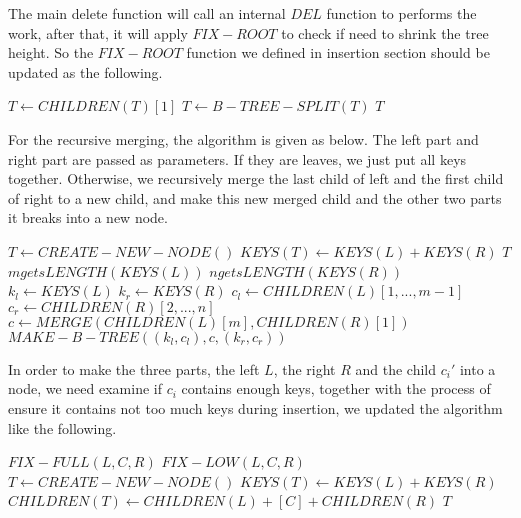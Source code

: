 \documentclass{article}
\begin{document}
The main delete function will call an internal $DEL$ function to
performs the work, after that, it will apply $FIX-ROOT$ to check
if need to shrink the tree height. So the $FIX-ROOT$ function we
defined in insertion section should be updated as the following.

\begin{algorithmic}[1]
   
    \State $T \gets CHILDREN(T)[1]$
    \State $T \gets B-TREE-SPLIT(T)$
  \EndIf
  \State \Return $T$
\EndFunction
\end{algorithmic}

For the recursive merging, the algorithm is given as below.
The left part and right part are passed as parameters. If
they are leaves, we just put all keys together. Otherwise,
we recursively merge the last child of left and the first child
of right to a new child, and make this new merged child and
the other two parts it breaks into a new node.

\begin{algorithmic}[1]
    \State $T \gets CREATE-NEW-NODE()$
    \State $KEYS(T) \gets KEYS(L)+KEYS(R)$
    \State \Return $T$
  \Else
    \State $m gets LENGTH(KEYS(L))$
    \State $n gets LENGTH(KEYS(R))$
    \State $k_l \gets KEYS(L)$
    \State $k_r \gets KEYS(R)$
    \State $c_l \gets CHILDREN(L)[1, ..., m-1]$
    \State $c_r \gets CHILDREN(R)[2, ..., n]$
    \State $c \gets MERGE(CHILDREN(L)[m], CHILDREN(R)[1])$
    \State \Return $MAKE-B-TREE((k_l, c_l), c, (k_r, c_r))$
  \EndIf
\EndFunction
\end{algorithmic}

In order to make the three parts, the left $L$, the right $R$ and
the child $c_i'$ into a node, we need examine if $c_i$ contains
enough keys, together with the process of ensure it contains not too
much keys during insertion, we updated the algorithm like the following.

\begin{algorithmic}[1]
    \State \Return $FIX-FULL(L, C, R)$
    \State \Return $FIX-LOW(L, C, R)$
  \Else
    \State $T \leftarrow CREATE-NEW-NODE()$
    \State $KEYS(T) \leftarrow KEYS(L) + KEYS(R)$
    \State $CHILDREN(T) \leftarrow CHILDREN(L)+[C]+CHILDREN(R)$
    \State \Return $T$
  \EndIf
\EndFunction
\end{algorithmic}
\end{document}
